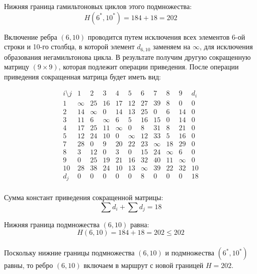 \documentclass{article}
\begin{document}
Нижняя граница гамильтоновых циклов этого подмножества:
\[
    H(6^*,10^*) = 184 + 18 = 202
\]

Включение ребра $(6,10)$ проводится путем исключения всех элементов 6-ой строки и 10-го столбца, в которой элемент $d_{6,10}$ заменяем на $\infty$, для исключения образования негамильтонова цикла.
В результате получим другую сокращенную матрицу $(9 \times 9)$, которая подлежит операции приведения.
После операции приведения сокращенная матрица будет иметь вид:

\[
    \begin{array}{c|ccccccccc|c}
        i \setminus j & 1      & 2      & 3      & 4      & 5      & 6      & 7      & 8      & 9      & d_i \\
        \hline
        1             & \infty & 25     & 16     & 17     & 12     & 27     & 39     & 8      & 0      & 0   \\
        2             & 14     & \infty & 0      & 14     & 13     & 25     & 0      & 6      & 14     & 0   \\
        3             & 11     & 6      & \infty & 6      & 5      & 16     & 15     & 0      & 14     & 0   \\
        4             & 17     & 25     & 11     & \infty & 0      & 8      & 31     & 8      & 21     & 0   \\
        5             & 12     & 24     & 10     & 0      & \infty & 12     & 33     & 5      & 16     & 0   \\
        7             & 28     & 0      & 9      & 20     & 22     & 23     & \infty & 18     & 29     & 0   \\
        8             & 3      & 12     & 0      & 3      & 0      & 15     & 24     & \infty & 6      & 0   \\
        9             & 0      & 25     & 19     & 21     & 16     & 32     & 40     & 11     & \infty & 0   \\
        10            & 28     & 38     & 24     & 10     & 13     & \infty & 39     & 22     & 32     & 10  \\
        \hline
        d_j           & 0      & 0      & 0      & 0      & 0      & 8      & 0      & 0      & 0      & 18  \\
    \end{array}
\]

Сумма констант приведения сокращенной матрицы:
\[
    \sum d_i + \sum d_j = 18
\]

Нижняя граница подмножества $(6,10)$ равна:
\[
    H(6,10) = 184 + 18 = 202 \leq 202
\]\\
Поскольку нижние границы подмножества $(6,10)$ и подмножества $(6^*,10^*)$ равны, то ребро $(6,10)$ включаем в маршрут с новой границей $H=202$.
\end{document}

